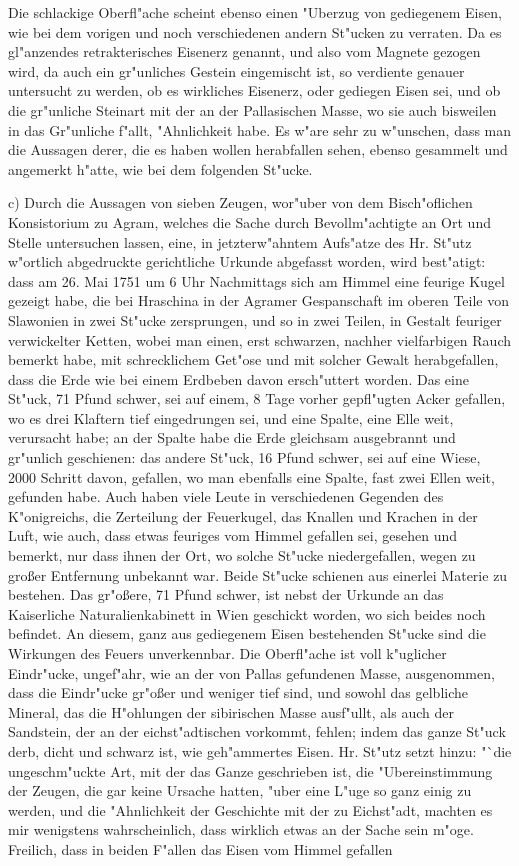 \documentclass[a4paper, 11pt, oneside, polutonikogreek, german]{article}
\begin{document}
Die schlackige Oberfl"ache scheint ebenso einen "Uberzug von gediegenem Eisen, wie bei dem vorigen und noch verschiedenen andern St"ucken zu verraten. Da es gl"anzendes retrakterisches Eisenerz genannt, und also vom Magnete gezogen wird, da auch ein gr"unliches Gestein eingemischt ist, so verdiente genauer untersucht zu werden, ob es wirkliches Eisenerz, oder gediegen Eisen sei, und ob die gr"unliche Steinart mit der an der Pallasischen Masse, wo sie auch bisweilen in das Gr"unliche f"allt, "Ahnlichkeit habe. Es w"are sehr zu w"unschen, dass man die Aussagen derer, die es haben wollen herabfallen sehen, ebenso gesammelt und angemerkt h"atte, wie bei dem folgenden St"ucke.

c) Durch die Aussagen von sieben Zeugen, wor"uber von dem Bisch"oflichen Konsistorium zu Agram, welches die Sache durch Bevollm"achtigte an Ort und Stelle untersuchen lassen, eine, in jetzterw"ahntem Aufs"atze des Hr. St"utz w"ortlich abgedruckte gerichtliche Urkunde abgefasst worden, wird best"atigt: dass am 26. Mai 1751 um 6 Uhr Nachmittags sich am Himmel eine feurige Kugel gezeigt habe, die bei Hraschina in der Agramer Gespanschaft im oberen Teile von Slawonien in zwei St"ucke zersprungen, und so in zwei Teilen, in Gestalt feuriger verwickelter Ketten, wobei man einen, erst schwarzen, nachher vielfarbigen Rauch bemerkt habe, mit schrecklichem Get"ose und mit solcher Gewalt herabgefallen, dass die Erde wie bei einem Erdbeben davon ersch"uttert worden. Das eine St"uck, 71 Pfund schwer, sei auf einem, 8 Tage vorher gepfl"ugten Acker gefallen, wo es drei Klaftern tief eingedrungen sei, und eine Spalte, eine Elle weit, verursacht habe; an der Spalte habe die Erde gleichsam ausgebrannt und gr"unlich geschienen: das andere St"uck, 16 Pfund schwer, sei auf eine Wiese, 2000 Schritt davon, gefallen, wo man ebenfalls eine Spalte, fast zwei Ellen weit, gefunden habe. Auch haben viele Leute in verschiedenen Gegenden des K"onigreichs, die Zerteilung der Feuerkugel, das Knallen und Krachen in der Luft, wie auch, dass etwas feuriges vom Himmel gefallen sei, gesehen und bemerkt, nur dass ihnen der Ort, wo solche St"ucke niedergefallen, wegen zu großer Entfernung unbekannt war. Beide St"ucke schienen aus einerlei Materie zu bestehen. Das gr"oßere, 71 Pfund schwer, ist nebst der Urkunde an das Kaiserliche Naturalienkabinett in Wien geschickt worden, wo sich beides noch befindet. An diesem, ganz aus gediegenem Eisen bestehenden St"ucke sind die Wirkungen des Feuers unverkennbar. Die Oberfl"ache ist voll k"uglicher Eindr"ucke, ungef"ahr, wie an der von Pallas gefundenen Masse, ausgenommen, dass die Eindr"ucke gr"oßer und weniger tief sind, und sowohl das gelbliche Mineral, das die H"ohlungen der sibirischen Masse ausf"ullt, als auch der Sandstein, der an der eichst"adtischen vorkommt, fehlen; indem das ganze St"uck derb, dicht und schwarz ist, wie geh"ammertes Eisen. Hr. St"utz setzt hinzu: "`die ungeschm"uckte Art, mit der das Ganze geschrieben ist, die "Ubereinstimmung der Zeugen, die gar keine Ursache hatten, "uber eine L"uge so ganz einig zu werden, und die "Ahnlichkeit der Geschichte mit der zu Eichst"adt, machten es mir wenigstens wahrscheinlich, dass wirklich etwas an der Sache sein m"oge. Freilich, dass in beiden F"allen das Eisen vom Himmel gefallen 
\end{document}
